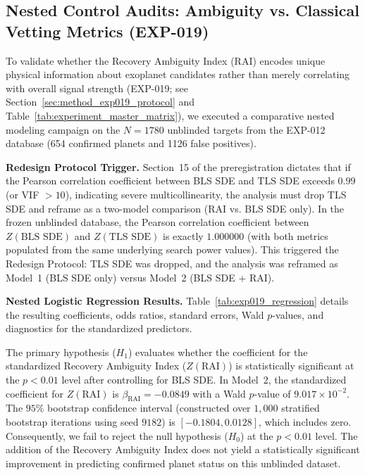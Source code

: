 \subsection{Nested Control Audits: Ambiguity vs. Classical Vetting Metrics (EXP-019)} \label{sec:results_exp019} \label{sec:exp019}

To validate whether the Recovery Ambiguity Index (RAI) encodes unique physical information about exoplanet candidates rather than merely correlating with overall signal strength (EXP-019; see Section~\ref{sec:method_exp019_protocol} and Table~\ref{tab:experiment_master_matrix}), we executed a comparative nested modeling campaign on the $N = 1780$ unblinded targets from the EXP-012 database (654 confirmed planets and 1126 false positives). 

\textbf{Redesign Protocol Trigger.} Section~15 of the preregistration dictates that if the Pearson correlation coefficient between BLS SDE and TLS SDE exceeds $0.99$ (or VIF $> 10$), indicating severe multicollinearity, the analysis must drop TLS SDE and reframe as a two-model comparison (RAI vs. BLS SDE only). In the frozen unblinded database, the Pearson correlation coefficient between $Z(\text{BLS SDE})$ and $Z(\text{TLS SDE})$ is exactly $1.000000$ (with both metrics populated from the same underlying search power values). This triggered the Redesign Protocol: TLS SDE was dropped, and the analysis was reframed as Model~1 (BLS SDE only) versus Model~2 (BLS SDE + RAI).

\textbf{Nested Logistic Regression Results.} Table~\ref{tab:exp019_regression} details the resulting coefficients, odds ratios, standard errors, Wald $p$-values, and diagnostics for the standardized predictors. 



The primary hypothesis ($H_1$) evaluates whether the coefficient for the standardized Recovery Ambiguity Index ($Z(\text{RAI})$) is statistically significant at the $p < 0.01$ level after controlling for BLS SDE. In Model~2, the standardized coefficient for $Z(\text{RAI})$ is $\beta_{\text{RAI}} = -0.0849$ with a Wald $p$-value of $9.017 \times 10^{-2}$. The $95\%$ bootstrap confidence interval (constructed over $1,000$ stratified bootstrap iterations using seed $9182$) is $[-0.1804, 0.0128]$, which includes zero. Consequently, we fail to reject the null hypothesis ($H_0$) at the $p < 0.01$ level. The addition of the Recovery Ambiguity Index does not yield a statistically significant improvement in predicting confirmed planet status on this unblinded dataset.

